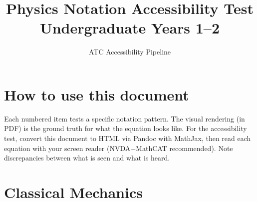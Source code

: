 \documentclass[11pt]{article}
\title{Physics Notation Accessibility Test \\
       \large Undergraduate Years 1--2}
\author{ATC Accessibility Pipeline}
\date{}
\begin{document}
\maketitle

\section*{How to use this document}

Each numbered item tests a specific notation pattern. The visual
rendering (in PDF) is the ground truth for what the equation looks like.
For the accessibility test, convert this document to HTML via Pandoc with
MathJax, then read each equation with your screen reader (NVDA+MathCAT
recommended). Note discrepancies between what is seen and what is heard.

\section{Classical Mechanics}
\end{document}
